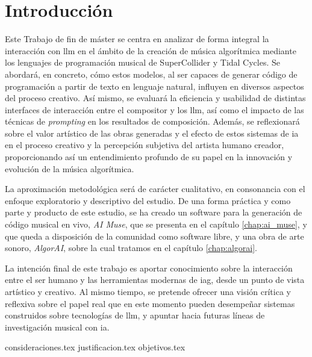 \chapter{Introducción}



Este Trabajo de fin de máster se centra en analizar de forma integral la interacción con \gls{llm} en el ámbito de la creación de música algorítmica mediante los lenguajes de programación musical de SuperCollider y Tidal Cycles. Se abordará, en concreto, cómo estos modelos, al ser capaces de generar código de programación a partir de texto en lenguaje natural, influyen en diversos aspectos del proceso creativo. Así mismo, se evaluará la eficiencia y usabilidad de distintas interfaces de interacción entre el compositor y los \gls{llm}, así como el impacto de las técnicas de \emph{prompting} en los resultados de composición. Además, se reflexionará sobre el valor artístico de las obras generadas y el efecto de estos sistemas de \gls{ia} en el proceso creativo y la percepción subjetiva del artista humano creador, proporcionando así un entendimiento profundo de su papel en la innovación y evolución de la música algorítmica.

La aproximación metodológica será de carácter cualitativo, en consonancia con el enfoque exploratorio y descriptivo del estudio. De una forma práctica y como parte y producto de este estudio, se ha creado un software para la generación de código musical en vivo, \emph{AI Muse}, que se presenta en el capítulo \ref{chap:ai_muse}, y que queda a disposición de la comunidad como software libre, y una obra de arte sonoro, \emph{AlgorAI}, sobre la cual tratamos en el capítulo \ref{chap:algorai}.

La intención final de este trabajo es aportar conocimiento sobre la interacción entre el ser humano y las herramientas modernas de \gls{iag}, desde un punto de vista artístico y creativo. Al mismo tiempo, se pretende ofrecer una visión crítica y reflexiva sobre el papel real que en este momento pueden desempeñar sistemas construidos sobre tecnologías de \gls{llm}, y apuntar hacia futuras líneas de investigación musical con \gls{ia}.



{consideraciones.tex}
{justificacion.tex}
{objetivos.tex}
